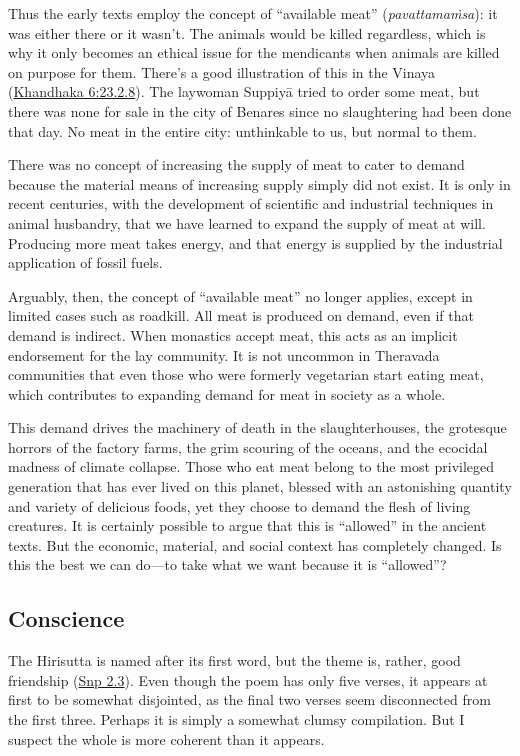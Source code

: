 \documentclass[12pt,openany]{book}%
\begin{document}
Thus the early texts employ the concept of “available meat” (\textit{\textsanskrit{pavattamaṁsa}}): it was either there or it wasn’t. The animals would be killed regardless, which is why it only becomes an ethical issue for the mendicants when animals are killed on purpose for them. There’s a good illustration of this in the Vinaya (\href{https://suttacentral.net/pli-tv-kd6/en/brahmali\#23.2.8}{Khandhaka 6:23.2.8}). The laywoman \textsanskrit{Suppiyā} tried to order some meat, but there was none for sale in the city of Benares since no slaughtering had been done that day. No meat in the entire city: unthinkable to us, but normal to them.

There was no concept of increasing the supply of meat to cater to demand because the material means of increasing supply simply did not exist. It is only in recent centuries, with the development of scientific and industrial techniques in animal husbandry, that we have learned to expand the supply of meat at will. Producing more meat takes energy, and that energy is supplied by the industrial application of fossil fuels.

Arguably, then, the concept of “available meat” no longer applies, except in limited cases such as roadkill. All meat is produced on demand, even if that demand is indirect. When monastics accept meat, this acts as an implicit endorsement for the lay community. It is not uncommon in Theravada communities that even those who were formerly vegetarian start eating meat, which contributes to expanding demand for meat in society as a whole.

This demand drives the machinery of death in the slaughterhouses, the grotesque horrors of the factory farms, the grim scouring of the oceans, and the ecocidal madness of climate collapse. Those who eat meat belong to the most privileged generation that has ever lived on this planet, blessed with an astonishing quantity and variety of delicious foods, yet they choose to demand the flesh of living creatures. It is certainly possible to argue that this is “allowed” in the ancient texts. But the economic, material, and social context has completely changed. Is this the best we can do—to take what we want because it is “allowed”?

\subsection*{Conscience}

The Hirisutta is named after its first word, but the theme is, rather, good friendship (\href{https://suttacentral.net/snp2.3/en/sujato}{Snp 2.3}). Even though the poem has only five verses, it appears at first to be somewhat disjointed, as the final two verses seem disconnected from the first three. Perhaps it is simply a somewhat clumsy compilation. But I suspect the whole is more coherent than it appears.
\end{document}
